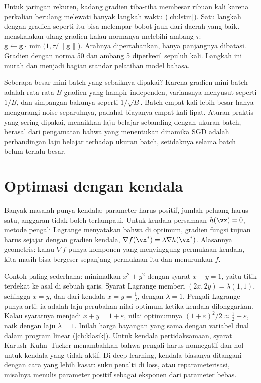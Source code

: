 Untuk jaringan rekuren, kadang gradien tiba-tiba membesar ribuan kali karena perkalian berulang melewati banyak
langkah waktu (\cref{ch:lstm}). Satu langkah dengan gradien seperti itu bisa melempar bobot jauh dari daerah yang baik.
 menskalakan ulang gradien kalau normanya melebihi ambang $\tau$:
$\bm g\leftarrow\bm g\cdot\min\big(1,\tau/\|\bm g\|\big)$. Arahnya dipertahankan, hanya panjangnya dibatasi. Gradien dengan
norma 50 dan ambang 5 diperkecil sepuluh kali. Langkah ini murah dan menjadi bagian standar pelatihan model bahasa.

Seberapa besar mini-batch yang sebaiknya dipakai? Karena gradien mini-batch adalah rata-rata $B$ gradien yang hampir
independen, variansnya menyusut seperti $1/B$, dan simpangan bakunya seperti $1/\sqrt B$. Batch empat kali lebih besar
hanya mengurangi noise separuhnya, padahal biayanya empat kali lipat. Aturan praktis yang sering dipakai, menaikkan
laju belajar sebanding dengan ukuran batch, berasal dari pengamatan bahwa yang menentukan dinamika SGD adalah
perbandingan laju belajar terhadap ukuran batch, setidaknya selama batch belum terlalu besar.

\section{Optimasi dengan kendala}

Banyak masalah punya kendala: parameter harus positif, jumlah peluang harus satu, anggaran tidak boleh terlampaui.
Untuk kendala persamaan $h(\vx)=0$, metode pengali Lagrange menyatakan bahwa di optimum, gradien fungsi tujuan harus
sejajar dengan gradien kendala, $\nabla f(\vx^*)=\lambda\nabla h(\vx^*)$. Alasannya geometris: kalau $\nabla f$ punya
komponen yang menyinggung permukaan kendala, kita masih bisa bergeser sepanjang permukaan itu dan menurunkan $f$.

Contoh paling sederhana: minimalkan $x^2+y^2$ dengan syarat $x+y=1$, yaitu titik terdekat ke asal di sebuah garis.
Syarat Lagrange memberi $(2x,2y)=\lambda(1,1)$, sehingga $x=y$, dan dari kendala $x=y=\tfrac12$, dengan $\lambda=1$.
Pengali Lagrange punya arti: ia adalah laju perubahan nilai optimum ketika kendala dilonggarkan. Kalau syaratnya
menjadi $x+y=1+\varepsilon$, nilai optimumnya $(1+\varepsilon)^2/2\approx\tfrac12+\varepsilon$, naik dengan laju $\lambda=1$.
Inilah harga bayangan yang sama dengan variabel dual dalam program linear (\cref{ch:klasik}). Untuk kendala
pertidaksamaan, syarat Karush--Kuhn--Tucker menambahkan bahwa pengali harus nonnegatif dan nol untuk kendala yang tidak
aktif. Di deep learning, kendala biasanya ditangani dengan cara yang lebih kasar: suku penalti di loss, atau
reparameterisasi, misalnya menulis parameter positif sebagai eksponen dari parameter bebas.

